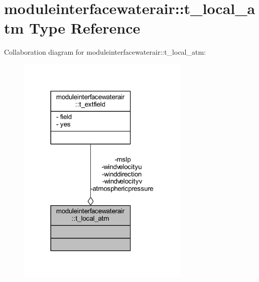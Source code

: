 \hypertarget{structmoduleinterfacewaterair_1_1t__local__atm}{}\section{moduleinterfacewaterair\+:\+:t\+\_\+local\+\_\+atm Type Reference}
\label{structmoduleinterfacewaterair_1_1t__local__atm}


Collaboration diagram for moduleinterfacewaterair\+:\+:t\+\_\+local\+\_\+atm\+:\nopagebreak
\begin{figure}[H]
\begin{center}
\leavevmode
\includegraphics[width=234pt]{structmoduleinterfacewaterair_1_1t__local__atm__coll__graph}
\end{center}
\end{figure}
